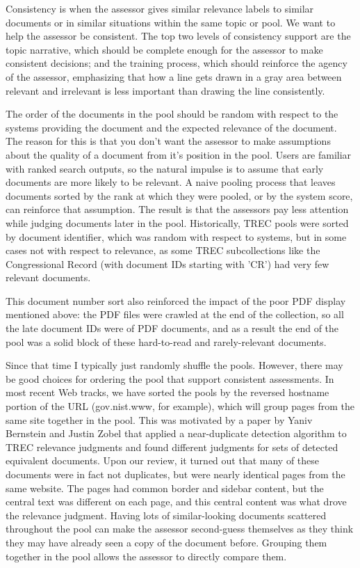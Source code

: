 \documentclass[nobib]{tufte-book}
\begin{document}
Consistency is when the assessor gives similar relevance labels to similar documents or in similar situations within the same topic or pool.  We want to help the assessor be consistent.  The top two levels of consistency support are the topic narrative, which should be complete enough for the assessor to make consistent decisions; and the training process, which should reinforce the agency of the assessor, emphasizing that how a line gets drawn in a gray area between relevant and irrelevant is less important than drawing the line consistently.

The order of the documents in the pool should be random with respect to the systems providing the document and the expected relevance of the document.  The reason for this is that you don't want the assessor to make assumptions about the quality of a document from it's position in the pool.  Users are familiar with ranked search outputs, so the natural impulse is to assume that early documents are more likely to be relevant.  A naive pooling process that leaves documents sorted by the rank at which they were pooled, or by the system score, can reinforce that assumption.  The result is that the assessors pay less attention while judging documents later in the pool.  Historically, TREC pools were sorted by document identifier, which was random with respect to systems, but in some cases not with respect to relevance, as some TREC subcollections like the Congressional Record (with document IDs starting with 'CR') had very few relevant documents.  

This document number sort also reinforced the impact of the poor PDF display mentioned above: the PDF files were crawled at the end of the collection, so all the late document IDs were of PDF documents, and as a result the end of the pool was a solid block of these hard-to-read and rarely-relevant documents.

Since that time I typically just randomly shuffle the pools.  However, there may be good choices for ordering the pool that support consistent assessments.  In most recent Web tracks, we have sorted the pools by the reversed hostname portion of the URL (gov.nist.www, for example), which will group pages from the same site together in the pool.  This was motivated by a paper by Yaniv Bernstein and Justin Zobel\autocite{bernstein_redundant_2005} that applied a near-duplicate detection algorithm to TREC relevance judgments and found different judgments for sets of detected equivalent documents.  Upon our review, it turned out that many of these documents were in fact not duplicates, but were nearly identical pages from the same website.  The pages had common border and sidebar content, but the central text was different on each page, and this central content was what drove the relevance judgment.  Having lots of similar-looking documents scattered throughout the pool can make the assessor second-guess themselves as they think they may have already seen a copy of the document before.  Grouping them together in the pool allows the assessor to directly compare them.
\end{document}
